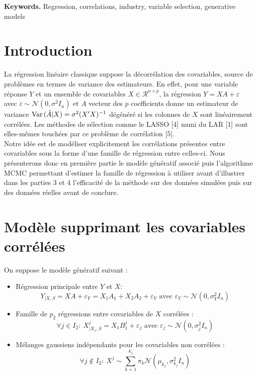 \documentclass[12pt]{article}
\begin{document}
{\bf Keywords.} Regression, correlations, industry, variable selection, generative models


\section{Introduction}
	La régression linéaire classique suppose la décorrélation des covariables, source de problèmes en termes de variance des estimateurs. En effet, pour une variable réponse $Y$ et un ensemble de covariables $X \in \mathcal{R}^{n \times p}$, la régression $Y=XA+\varepsilon$ avec $ \varepsilon\sim \mathcal{N}(0,\sigma^2I_n)$ et $A$ vecteur des $p$ coefficients donne un estimateur de variance $ {\rm Var}\,(\hat{A}|X)= \sigma^2(X'X)^{-1}$ dégénéré si les colonnes de $X$ sont linéairement corrélées. Les méthodes de sélection comme le LASSO [4] muni du LAR [1] sont elles-mêmes touchées par ce problème de corrélation [5].
		\\
		
		Notre idée est de modéliser explicitement les corrélations présentes entre covariables sous la forme d'une famille de régression entre celles-ci. Nous présenterons donc en première partie le modèle génératif associé puis l'algorithme MCMC permettant d'estimer la famille de régression à utiliser avant d'illustrer dans les parties 3 et 4 l'efficacité de la méthode sur des données simulées puis sur des données réelles avant de conclure.
		
\section{Modèle supprimant les covariables corrélées}		
	On suppose le modèle génératif suivant :
	
	\begin{itemize}
		\item Régression principale entre $Y$ et $X$:
			 \begin{equation}
			 	Y_{|X,S}=XA+\varepsilon_Y= X_1A_{1}+X_2A_{2}+\varepsilon_Y \textrm{ avec } \varepsilon_Y \sim \mathcal{N}(0,\sigma_Y^2I_n) \label{MainR}
			 \end{equation}
		\item Famille de $p_2$ régressions entre covariables de $X$ corrélées :
			\begin{equation}
			\forall j \in I_2 : \  X^j_{|X_1,S}=X_1B_{1}^j + \varepsilon_{j} \textrm{ avec } \varepsilon_j \sim \mathcal{N}(0,\sigma_j^2I_n) \label{SR}
			\end{equation}
		\item Mélanges gaussiens indépendants pour les covariables non corrélées :
			\begin{equation}
				\forall j \notin I_2 : \ X^j \sim \sum_{k=1}^{k_j}\pi_k\mathcal{N}(\mu_{k_j},\sigma_{k_j}^2I_n)
			\end{equation}
	\end{itemize}
	
\end{document}

